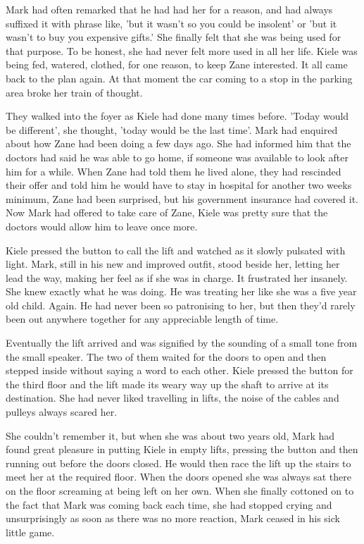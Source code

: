 Mark had often remarked that he had had her for a reason, and had always suffixed it with phrase like, 'but it wasn't so you could be insolent' or 'but it wasn't to buy you expensive gifts.'  She finally felt that she was being used for that purpose.  To be honest, she had never felt more used in all her life.  Kiele was being fed, watered, clothed, for one reason, to keep Zane interested.  It all came back to the plan again.  At that moment the car coming to a stop in the parking area broke her train of thought.



\thoughtbreak



They walked into the foyer as Kiele had done many times before.  'Today would be different', she thought, 'today would be the last time'.  Mark had enquired about how Zane had been doing a few days ago.  She had informed him that the doctors had said he was able to go home, if someone was available to look after him for a while.  When Zane had told them he lived alone, they had rescinded their offer and told him he would have to stay in hospital for another two weeks minimum, Zane had been surprised, but his government insurance had covered it.  Now Mark had offered to take care of Zane, Kiele was pretty sure that the doctors would allow him to leave once more.

Kiele pressed the button to call the lift and watched as it slowly pulsated with light.  Mark, still in his new and improved outfit, stood beside her, letting her lead the way, making her feel as if she was in charge.  It frustrated her insanely.  She knew exactly what he was doing.  He was treating her like she was a five year old child.  Again.  He had never been so patronising to her, but then they'd rarely been out anywhere together for any appreciable length of time.

Eventually the lift arrived and was signified by the sounding of a small tone from the small speaker.  The two of them waited for the doors to open and then stepped inside without saying a word to each other.  Kiele pressed the button for the third floor and the lift made its weary way up the shaft to arrive at its destination.  She had never liked travelling in lifts, the noise of the cables and pulleys always scared her.  

She couldn't remember it, but when she was about two years old, Mark had found great pleasure in putting Kiele in empty lifts, pressing the button and then running out before the doors closed.  He would then race the lift up the stairs to meet her at the required floor.  When the doors opened she was always sat there on the floor screaming at being left on her own.  When she finally cottoned on to the fact that Mark was coming back each time, she had stopped crying and unsurprisingly as soon as there was no more reaction, Mark ceased in his sick little game.

